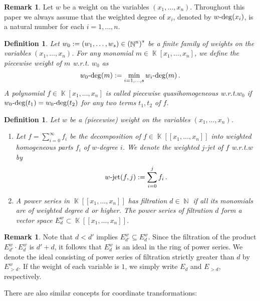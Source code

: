\documentclass[noend]{amsproc}
\newtheorem{defn}[theorem]{Definition}
\theoremstyle{definition}
\newtheorem{remark}[theorem]{Remark}
\let\originalleft\left
\let\originalright\right
\renewcommand{\left}{\mathopen{}\mathclose\bgroup\originalleft}
\renewcommand{\right}{\aftergroup\egroup\originalright}
\DeclareMathOperator{\N}{\mathbb{N}}
\DeclareMathOperator{\K}{\mathbb{K}}
\DeclareMathOperator{\dash}{\!\textnormal{-}\!}
\DeclareMathOperator{\jet}{jet}
\begin{document}
\begin{remark}
Let $w$ be a weight on the variables $(x_1, \ldots, x_n)$. Throughout this
paper we always assume that the weighted degree of $x_i$, denoted by
$w\dash\deg(x_i)$, is a natural number for each $i = 1, \ldots, n$.
\end{remark}

\begin{defn}
Let $w_0 := (w_1, \ldots, w_s) \in \left(\N^n\right)^s$ be a finite family of
weights on the variables $(x_1, \ldots, x_n)$. For any monomial
$m \in \K[x_1,\ldots,x_n]$, we define the piecewise weight of $m$ w.r.t.\@
$w_0$ as
\[
w_0\dash\deg(m) := \min_{i = 1, \ldots, s} w_i\dash\deg(m) \,.
\]
A polynomial $f \in \K[x_1,\ldots,x_n]$ is called piecewise quasihomogeneous
w.r.t.\@ $w_0$ if $w_0\dash\deg(t_1) = w_0\dash\deg(t_2)$ for any two terms
$t_1, t_2$ of $f$.
\end{defn}

\begin{defn}
Let $w$ be a (piecewise) weight on the variables $(x_1,\ldots,x_n)$.

\begin{enumerate}
\item
Let $f = \sum_{i = 0}^{\infty} f_i$ be the decomposition of
$f \in \K[[x_1,\ldots,x_n]]$ into weighted homogeneous parts $f_i$ of
$w$-degree $i$. We denote the weighted $j$-jet of $f$ w.r.t.\@ $w$ by
\[
w \dash \jet(f, j) := \sum_{i = 0}^j f_i \,.
\]

\item
A power series in $\K[[x_1,\ldots,x_n]]$ has filtration $d \in \N$ if all its
monomials are of weighted degree $d$ or higher. The power series of filtration
$d$ form a vector space $E_d^w \subset \K[[x_1,\ldots,x_n]]$.
\end{enumerate}
\end{defn}

\begin{remark}
Note that $d < d'$ implies $E_{d'}^w \subseteq E_d^w$. Since the filtration of
the product $E_{d'}^w \cdot E_d^w$ is $d'+d$, it follows that $E_d^w$ is an
ideal in the ring of power series. We denote the ideal consisting of power
series of filtration strictly greater than $d$ by $E_{>d}^w$. If the weight
of each variable is $1$, we simply write $E_d$ and $E_{>d}$, respectively.
\end{remark}

There are also similar concepts for coordinate transformations:
\end{document}
